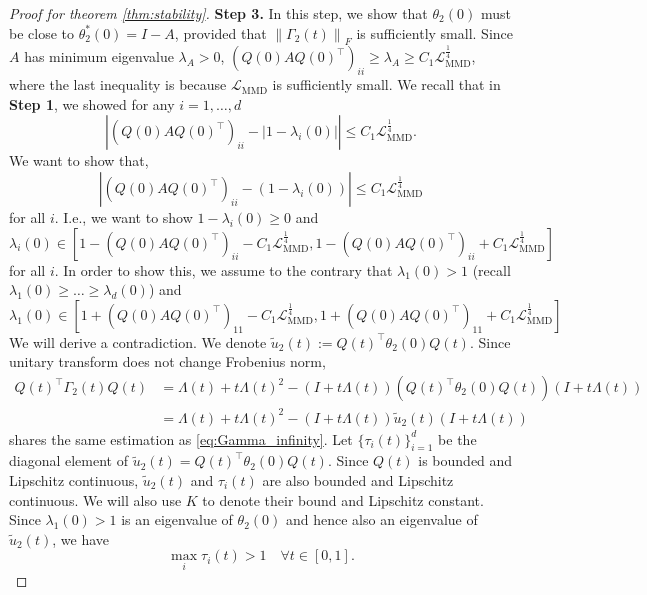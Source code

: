 \documentclass{article} %
\theoremstyle{plain}
\theoremstyle{definition}
\theoremstyle{remark}
\newcommand{\norm}[2][H^s]{\left\|#2\right\|_{#1}}
\newcommand{\LMMD}{\mathcal{L}_{\text{MMD}}}
\newcommand{\lam}{\lambda}
\newcommand{\Lam}{\Lambda}
\newcommand{\Ge}{\Gamma_2}
\newcommand{\wt}{\widetilde}
\newcommand{\tp}{^{\top}}
\newcommand{\sqbra}[1]{\left[#1\right]}
\newcommand{\abs}[1]{\left|#1\right|}
\begin{document}
\begin{proof}[Proof for theorem \ref{thm:stability}]
\medskip
\textbf{Step 3.} In this step, we show that $\theta_2(0)$ must be close to $\theta_2^*(0) = I-A$, provided that $\norm[F]{\Ge(t)}$ is sufficiently small. Since $A$ has minimum eigenvalue $\lam_A > 0$, $(Q(0)AQ(0)\tp)_{ii} \ge \lam_A \ge C_1 \LMMD^{\frac14}$, where the last inequality is because $\LMMD$ is sufficiently small. We recall that in \textbf{Step 1}, we showed for any $i=1,\ldots,d$
$$\abs{ (Q(0)AQ(0)\tp)_{ii} - |1 - \lam_i(0)|} \le C_1 \LMMD^{\frac14}.$$ 
We want to show that,
\begin{equation}\label{eq:step3_goal}
\abs{ (Q(0)AQ(0)\tp)_{ii} - (1 - \lam_i(0))} \le C_1 \LMMD^{\frac14}
\end{equation}
for all $i$. I.e., we want to show $1 - \lam_i(0) \ge 0$ and 
$$\lam_i(0) \in \sqbra{1- (Q(0)AQ(0)\tp)_{ii} - C_1 \LMMD^{\frac14}, 1- (Q(0)AQ(0)\tp)_{ii} + C_1 \LMMD^{\frac14}}$$
for all $i$. In order to show this, we assume to the contrary that $\lam_1(0) > 1$ (recall $\lam_1(0) \ge \ldots\ge \lam_d(0)$) and
\begin{equation}\label{eq:step3_contra}
\lam_1(0) \in \sqbra{1+ (Q(0)AQ(0)\tp)_{11} - C_1 \LMMD^{\frac14}, 1+ (Q(0)AQ(0)\tp)_{11} + C_1 \LMMD^{\frac14}}
\end{equation}
We will derive a contradiction. We denote $\wt{u}_2(t) := Q(t)\tp \theta_2(0) Q(t)$. Since unitary transform does not change Frobenius norm,  
\begin{equation}\label{eq:step3_temp}
\begin{aligned}
Q(t)\tp \Ge(t) Q(t) &= \Lam(t) + t \Lam(t)^2 - (I + t \Lam(t)) (Q(t)\tp \theta_2(0) Q(t)) (I + t \Lam(t)) \\
&= \Lam(t) + t \Lam(t)^2 - (I + t \Lam(t)) \wt{u}_2(t) (I + t \Lam(t))
\end{aligned}
\end{equation}
shares the same estimation as \eqref{eq:Gamma_infinity}. Let $\{\tau_i(t)\}_{i=1}^d$ be the diagonal element of $\wt{u}_2(t) = Q(t)\tp \theta_2(0) Q(t)$. Since $Q(t)$ is bounded and Lipschitz continuous, $\wt{u}_2(t)$ and $\tau_i(t)$ are also bounded and Lipschitz continuous. We will also use $K$ to denote their bound and Lipschitz constant.
Since $\lam_1(0) > 1$ is an eigenvalue of $\theta_2(0)$ and hence also an eigenvalue of $\wt{u}_2(t)$, we have
$$\max_i \tau_i(t) > 1 \quad \forall t \in [0,1].$$


\end{proof}
\end{document}
